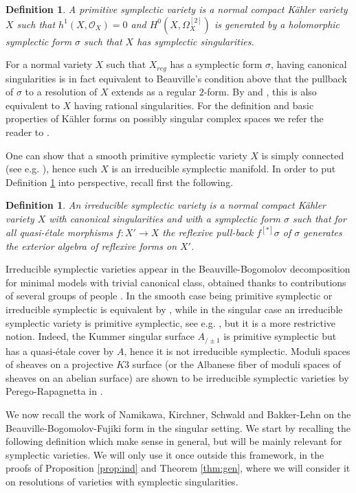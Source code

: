 \documentclass[12pt,reqno]{amsart}
\newtheorem{definition}[thm]{Definition}
\theoremstyle{plain}
\theoremstyle{definition}
\begin{document}
\begin{definition}\label{def:ISV}
A primitive symplectic variety is a normal compact K\"ahler variety $X$ such that $h^1(X,\mathcal O_X)=0$ and $H^0(X,\Omega_X^{[2]})$ is generated by a holomorphic symplectic form $\sigma$ such that $X$ has symplectic singularities.\end{definition}
For a normal variety $X$ such that $X_{reg}$ has a symplectic form $\sigma$, having canonical singularities is in fact equivalent to Beauville's condition above that the pullback of $\sigma$ to a resolution of $X$ extends as a regular $2$-form. By \cite{Elk81} and \cite[Corollary 1.7]{KS}, this is also equivalent to $X$ having rational singularities.
For the definition and basic properties of K\"ahler forms on possibly singular complex spaces we refer the reader to \cite[Section 2]{BL2}.

One can show that a smooth primitive symplectic variety $X$ is simply connected (see e.g. \cite[Theorem 1]{Sch1}), hence such $X$ is an irreducible symplectic manifold. 
In order to put Definition \ref{def:ISV} into perspective, recall first the following.
\begin{definition}\label{def:prim-ISV}
An irreducible symplectic variety is a normal  compact K\"ahler variety $X$ with canonical singularities
and with a symplectic form $\sigma$ such that for all quasi-\'etale morphisms $f:X'\to X$ the reflexive pull-back $f^{[*]}\sigma$ of $\sigma$ 
generates the exterior algebra of reflexive forms on $X'$. 
\end{definition}
Irreducible symplectic varieties appear in the Beauville-Bogomolov decomposition for minimal models with trivial canonical
class, obtained thanks to  contributions of several groups of people \cite{BGL, Cam20, Dru18, GGK, GKP16, HP}.  In the smooth case being primitive symplectic or irreducible symplectic is equivalent by \cite[Proposition 3]{Beau84}, while in the singular case an irreducible  symplectic variety is primitive symplectic, see e.g. \cite[Proposition 6.9]{GKP16}, but it is a more restrictive notion. Indeed, the Kummer singular surface $A_{/\pm1}$ is primitive symplectic but has a quasi-\'etale cover by $A$, hence it is not irreducible symplectic.  Moduli spaces of sheaves on a projective $K3$ surface (or the Albanese fiber of moduli spaces of sheaves on an abelian surface) are shown to be irreducible  symplectic varieties by Perego-Rapagnetta in \cite{PR}.

We now recall the work of Namikawa, Kirchner, Schwald and Bakker-Lehn on the Beauville-Bogomolov-Fujiki form in the singular setting. 
We start by recalling the following definition which make sense in general, but will be mainly relevant for symplectic varieties. 
We will only use it once outside this framework, in the proofs of Proposition \ref{prop:ind} and Theorem \ref{thm:gen}, where we will consider it on resolutions of varieties with 
symplectic singularities.
   
\end{document}
